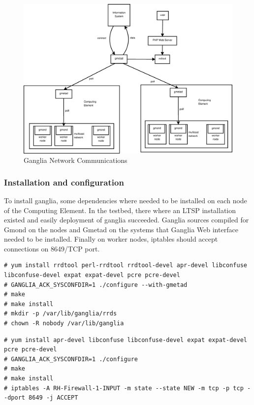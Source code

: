 \begin{figure}[htb]
\centering
 \includegraphics[width=130mm]{images/ganglia_data_flow.eps}
\caption{Ganglia Network Communications}
\label{figure:ganglia_network}
\end{figure}

\subsubsection{Installation and configuration}

To install ganglia, some dependencies where needed to be installed on each node of the Computing Element. In the testbed, there where an LTSP installation existed \cite{ltsp} and easily deployment of ganglia succeeded. Ganglia sources compiled for Gmond on the nodes and Gmetad on the systems that Ganglia Web interface needed to be installed. Finally on worker nodes, iptables should accept connections on 8649/TCP port.

\begin{lstlisting}
# yum install rrdtool perl-rrdtool rrdtool-devel apr-devel libconfuse libconfuse-devel expat expat-devel pcre pcre-devel
# GANGLIA_ACK_SYSCONFDIR=1 ./configure --with-gmetad
# make
# make install
# mkdir -p /var/lib/ganglia/rrds
# chown -R nobody /var/lib/ganglia
\end{lstlisting}

\begin{lstlisting}
# yum install apr-devel libconfuse libconfuse-devel expat expat-devel pcre pcre-devel
# GANGLIA_ACK_SYSCONFDIR=1 ./configure
# make
# make install
# iptables -A RH-Firewall-1-INPUT -m state --state NEW -m tcp -p tcp --dport 8649 -j ACCEPT
\end{lstlisting}


